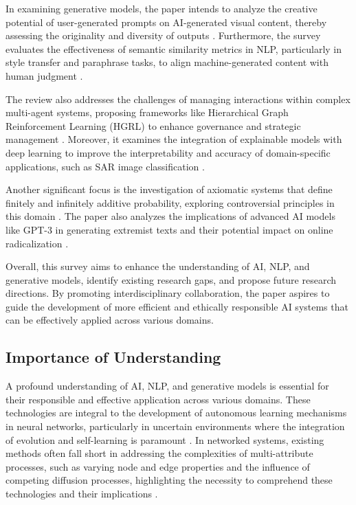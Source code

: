 In examining generative models, the paper intends to analyze the creative potential of user-generated prompts on AI-generated visual content, thereby assessing the originality and diversity of outputs \cite{palmini2024patternscreativityuserinput}. Furthermore, the survey evaluates the effectiveness of semantic similarity metrics in NLP, particularly in style transfer and paraphrase tasks, to align machine-generated content with human judgment \cite{yamshchikov2020styletransferparaphraselookingsensible}.



The review also addresses the challenges of managing interactions within complex multi-agent systems, proposing frameworks like Hierarchical Graph Reinforcement Learning (HGRL) to enhance governance and strategic management \cite{chen2024adaptivenetworkinterventioncomplex}. Moreover, it examines the integration of explainable models with deep learning to improve the interpretability and accuracy of domain-specific applications, such as SAR image classification \cite{huang2022physicallyexplainablecnnsar}.



Another significant focus is the investigation of axiomatic systems that define finitely and infinitely additive probability, exploring controversial principles in this domain \cite{cieslinski2022axiomstypefreesubjectiveprobability}. The paper also analyzes the implications of advanced AI models like GPT-3 in generating extremist texts and their potential impact on online radicalization \cite{mcguffie2020radicalizationrisksgpt3advanced}.



Overall, this survey aims to enhance the understanding of AI, NLP, and generative models, identify existing research gaps, and propose future research directions. By promoting interdisciplinary collaboration, the paper aspires to guide the development of more efficient and ethically responsible AI systems that can be effectively applied across various domains.



\subsection{Importance of Understanding} \label{subsec:Importance of Understanding}



A profound understanding of AI, NLP, and generative models is essential for their responsible and effective application across various domains. These technologies are integral to the development of autonomous learning mechanisms in neural networks, particularly in uncertain environments where the integration of evolution and self-learning is paramount \cite{le2019evolvingselfsupervisedneuralnetworks}. In networked systems, existing methods often fall short in addressing the complexities of multi-attribute processes, such as varying node and edge properties and the influence of competing diffusion processes, highlighting the necessity to comprehend these technologies and their implications \cite{shakarian2022reasoningcomplexnetworkslogic}.



